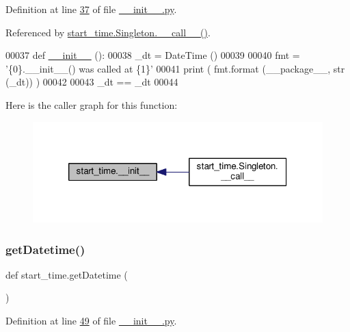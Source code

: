 Definition at line \hyperlink{start__time_2____init_____8py_source_l00037}{37} of file \hyperlink{start__time_2____init_____8py_source}{\+\_\+\+\_\+init\+\_\+\+\_\+.\+py}.



Referenced by \hyperlink{start__time_2____init_____8py_source_l00012}{start\+\_\+time.\+Singleton.\+\_\+\+\_\+call\+\_\+\+\_\+()}.


\begin{DoxyCode}
00037 \textcolor{keyword}{def }\hyperlink{namespacestart__time_a9c9bd378729a13c96a22c8b079ea172c}{\_\_init\_\_} ():
00038     \_dt = DateTime ()
00039     
00040     fmt = \textcolor{stringliteral}{'\{0\}.\_\_init\_\_() was called at \{1\}'}
00041     \textcolor{keywordflow}{print} ( fmt.format (\_\_package\_\_, str (\_dt)) )  
00042     
00043     \_dt == \_dt
00044     
\end{DoxyCode}
Here is the caller graph for this function\+:
\nopagebreak
\begin{figure}[H]
\begin{center}
\leavevmode
\includegraphics[width=320pt]{namespacestart__time_a9c9bd378729a13c96a22c8b079ea172c_icgraph}
\end{center}
\end{figure}
\mbox{\label{namespacestart__time_a52171f611eeff20ff03fd88c834220b0}} 
\subsubsection{\texorpdfstring{get\+Datetime()}{getDatetime()}}
{\footnotesize\ttfamily def start\+\_\+time.\+get\+Datetime (\begin{DoxyParamCaption}{ }\end{DoxyParamCaption})}



Definition at line \hyperlink{start__time_2____init_____8py_source_l00049}{49} of file \hyperlink{start__time_2____init_____8py_source}{\+\_\+\+\_\+init\+\_\+\+\_\+.\+py}.


